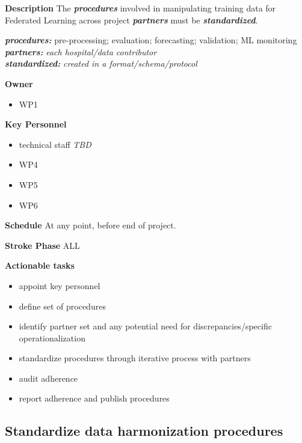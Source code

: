 \documentclass[
  letterpaper,
  DIV=11,
  numbers=noendperiod]{scrreport}
\providecommand{\tightlist}{%
  \setlength{\itemsep}{0pt}\setlength{\parskip}{0pt}}\usepackage{longtable,booktabs,array}
\begin{document}
\textbf{Description} The \textbf{\emph{procedures}} involved in
manipulating training data for Federated Learning across project
\textbf{\emph{partners}} must be \textbf{\emph{standardized}}.

\textbf{\emph{procedures:}} pre-processing; evaluation; forecasting;
validation; ML monitoring\\
\textbf{\emph{partners:}} \emph{each hospital/data contributor}\\
\textbf{\emph{standardized:}} \emph{created in a format/schema/protocol}

\textbf{Owner}

\begin{itemize}
\tightlist
\item
  WP1
\end{itemize}

\textbf{Key Personnel}

\begin{itemize}
\tightlist
\item
  technical staff \emph{TBD}
\item
  WP4
\item
  WP5
\item
  WP6
\end{itemize}

\textbf{Schedule} At any point, before end of project.

\textbf{Stroke Phase} ALL

\textbf{Actionable tasks}

\begin{itemize}
\tightlist
\item
  appoint key personnel
\item
  define set of procedures
\item
  identify partner set and any potential need for discrepancies/specific
  operationalization
\item
  standardize procedures through iterative process with partners
\item
  audit adherence
\item
  report adherence and publish procedures
\end{itemize}

\hypertarget{standardize-data-harmonization-procedures}{%
\subsection{Standardize data harmonization
procedures}\label{standardize-data-harmonization-procedures}}
\end{document}

